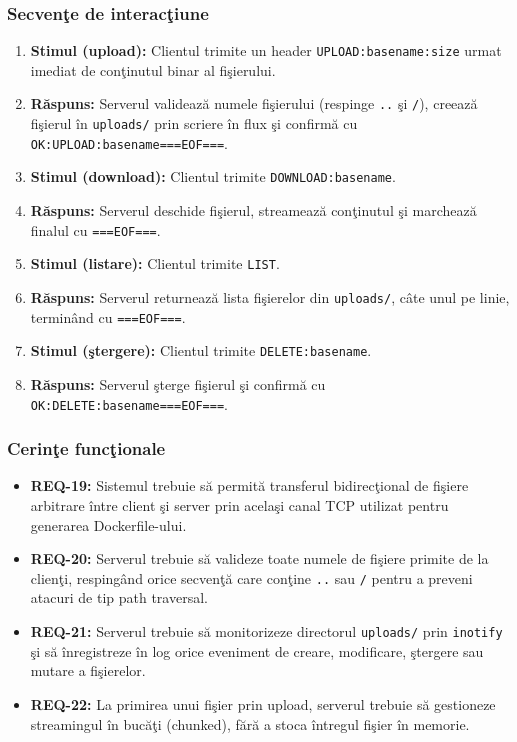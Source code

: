 \documentclass[12pt, a4paper]{article}
\begin{document}
\subsubsection{Secven\c{t}e de interac\c{t}iune}

\begin{enumerate}
    \item \textbf{Stimul (upload):} Clientul trimite un header \texttt{UPLOAD:basename:size} urmat imediat
    de con\c{t}inutul binar al fi\c{s}ierului.
    \item \textbf{R\u{a}spuns:} Serverul valideaz\u{a} numele fi\c{s}ierului (respinge \texttt{..} \c{s}i \texttt{/}), creeaz\u{a}
    fi\c{s}ierul \^{i}n \texttt{uploads/} prin scriere \^{i}n flux \c{s}i confirm\u{a} cu \texttt{OK:UPLOAD:basename===EOF===}.
    \item \textbf{Stimul (download):} Clientul trimite \texttt{DOWNLOAD:basename}.
    \item \textbf{R\u{a}spuns:} Serverul deschide fi\c{s}ierul, streameaz\u{a} con\c{t}inutul \c{s}i marcheaz\u{a} finalul
    cu \texttt{===EOF===}.
    \item \textbf{Stimul (listare):} Clientul trimite \texttt{LIST}.
    \item \textbf{R\u{a}spuns:} Serverul returneaz\u{a} lista fi\c{s}ierelor din \texttt{uploads/}, c\^{a}te unul pe linie,
    terminând cu \texttt{===EOF===}.
    \item \textbf{Stimul (\c{s}tergere):} Clientul trimite \texttt{DELETE:basename}.
    \item \textbf{R\u{a}spuns:} Serverul \c{s}terge fi\c{s}ierul \c{s}i confirm\u{a} cu \texttt{OK:DELETE:basename===EOF===}.
\end{enumerate}

\subsubsection{Cerin\c{t}e func\c{t}ionale}

\begin{itemize}
    \item \textbf{REQ-19:} Sistemul trebuie s\u{a} permit\u{a} transferul bidirecţional de fi\c{s}iere arbitrare
    \^{i}ntre client \c{s}i server prin acela\c{s}i canal TCP utilizat pentru generarea Dockerfile-ului.
    \item \textbf{REQ-20:} Serverul trebuie s\u{a} valideze toate numele de fi\c{s}iere primite de la clien\c{t}i,
    respingând orice secven\c{t}\u{a} care con\c{t}ine \texttt{..} sau \texttt{/} pentru a preveni atacuri de tip path
    traversal.
    \item \textbf{REQ-21:} Serverul trebuie s\u{a} monitorizeze directorul \texttt{uploads/} prin \texttt{inotify}
    \c{s}i s\u{a} \^{i}nregistreze \^{i}n log orice eveniment de creare, modificare, \c{s}tergere sau mutare a fi\c{s}ierelor.
    \item \textbf{REQ-22:} La primirea unui fi\c{s}ier prin upload, serverul trebuie s\u{a} gestioneze
    streamingul \^{i}n buc\u{a}\c{t}i (chunked), f\u{a}r\u{a} a stoca \^{i}ntregul fi\c{s}ier \^{i}n memorie.
\end{itemize}
\end{document}
